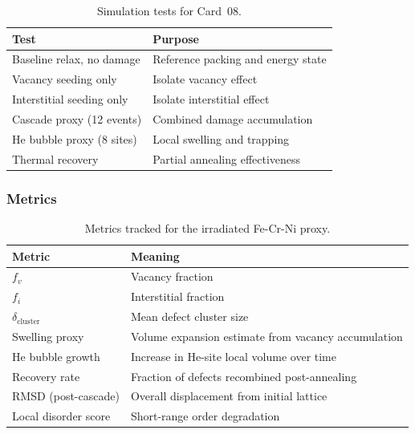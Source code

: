 \documentclass[12pt]{article}
\begin{document}
\begin{table}[H]
\centering
\caption{Simulation tests for Card~08.}
\label{tab:fecrnisub_tests}
\begin{tabular}{ll}
\toprule
\textbf{Test} & \textbf{Purpose} \\
\midrule
Baseline relax, no damage      & Reference packing and energy state \\
Vacancy seeding only           & Isolate vacancy effect \\
Interstitial seeding only      & Isolate interstitial effect \\
Cascade proxy (12 events)      & Combined damage accumulation \\
He bubble proxy (8 sites)      & Local swelling and trapping \\
Thermal recovery               & Partial annealing effectiveness \\
\bottomrule
\end{tabular}
\end{table}

\subsubsection*{Metrics}

\begin{table}[H]
\centering
\caption{Metrics tracked for the irradiated Fe-Cr-Ni proxy.}
\label{tab:fecrnisub_metrics}
\begin{tabular}{ll}
\toprule
\textbf{Metric} & \textbf{Meaning} \\
\midrule
$f_v$                         & Vacancy fraction \\
$f_i$                         & Interstitial fraction \\
$\delta_{\mathrm{cluster}}$   & Mean defect cluster size \\
Swelling proxy                & Volume expansion estimate from vacancy accumulation \\
He bubble growth              & Increase in He-site local volume over time \\
Recovery rate                 & Fraction of defects recombined post-annealing \\
RMSD (post-cascade)           & Overall displacement from initial lattice \\
Local disorder score          & Short-range order degradation \\
\bottomrule
\end{tabular}
\end{table}
\end{document}
